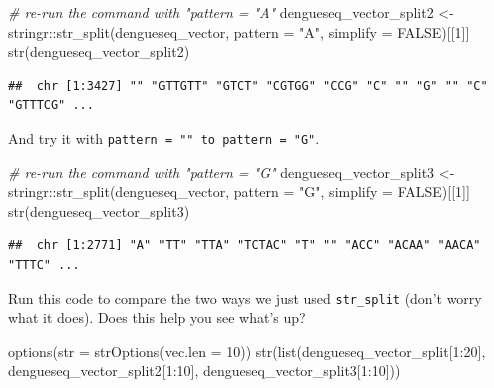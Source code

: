 \documentclass[
]{book}
\newenvironment{Shaded}{\begin{snugshade}}{\end{snugshade}}
\newcommand{\AttributeTok}[1]{\textcolor[rgb]{0.77,0.63,0.00}{#1}}
\newcommand{\CommentTok}[1]{\textcolor[rgb]{0.56,0.35,0.01}{\textit{#1}}}
\newcommand{\ConstantTok}[1]{\textcolor[rgb]{0.00,0.00,0.00}{#1}}
\newcommand{\DecValTok}[1]{\textcolor[rgb]{0.00,0.00,0.81}{#1}}
\newcommand{\FunctionTok}[1]{\textcolor[rgb]{0.00,0.00,0.00}{#1}}
\newcommand{\NormalTok}[1]{#1}
\newcommand{\OtherTok}[1]{\textcolor[rgb]{0.56,0.35,0.01}{#1}}
\newcommand{\SpecialCharTok}[1]{\textcolor[rgb]{0.00,0.00,0.00}{#1}}
\newcommand{\StringTok}[1]{\textcolor[rgb]{0.31,0.60,0.02}{#1}}
\begin{document}
\begin{Shaded}
\begin{Highlighting}[]
\CommentTok{\# re{-}run the command with "pattern  = "A"}
\NormalTok{dengueseq\_vector\_split2 }\OtherTok{\textless{}{-}}\NormalTok{ stringr}\SpecialCharTok{::}\FunctionTok{str\_split}\NormalTok{(dengueseq\_vector,}
                                       \AttributeTok{pattern =} \StringTok{"A"}\NormalTok{,}
                                       \AttributeTok{simplify =} \ConstantTok{FALSE}\NormalTok{)[[}\DecValTok{1}\NormalTok{]]}
\FunctionTok{str}\NormalTok{(dengueseq\_vector\_split2)}
\end{Highlighting}
\end{Shaded}

\begin{verbatim}
##  chr [1:3427] "" "GTTGTT" "GTCT" "CGTGG" "CCG" "C" "" "G" "" "C" "GTTTCG" ...
\end{verbatim}

And try it with \texttt{pattern\ =\ ""\ to\ pattern\ =\ "G"}.

\begin{Shaded}
\begin{Highlighting}[]
\CommentTok{\# re{-}run the command with "pattern  = "G"}
\NormalTok{dengueseq\_vector\_split3 }\OtherTok{\textless{}{-}}\NormalTok{ stringr}\SpecialCharTok{::}\FunctionTok{str\_split}\NormalTok{(dengueseq\_vector,}
                                       \AttributeTok{pattern =} \StringTok{"G"}\NormalTok{,}
                                       \AttributeTok{simplify =} \ConstantTok{FALSE}\NormalTok{)[[}\DecValTok{1}\NormalTok{]]}
\FunctionTok{str}\NormalTok{(dengueseq\_vector\_split3)}
\end{Highlighting}
\end{Shaded}

\begin{verbatim}
##  chr [1:2771] "A" "TT" "TTA" "TCTAC" "T" "" "ACC" "ACAA" "AACA" "TTTC" ...
\end{verbatim}

Run this code to compare the two ways we just used \texttt{str\_split} (don't worry what it does). Does this help you see what's up?

\begin{Shaded}
\begin{Highlighting}[]
\FunctionTok{options}\NormalTok{(}\AttributeTok{str =} \FunctionTok{strOptions}\NormalTok{(}\AttributeTok{vec.len =} \DecValTok{10}\NormalTok{))}
\FunctionTok{str}\NormalTok{(}\FunctionTok{list}\NormalTok{(dengueseq\_vector\_split[}\DecValTok{1}\SpecialCharTok{:}\DecValTok{20}\NormalTok{],}
\NormalTok{     dengueseq\_vector\_split2[}\DecValTok{1}\SpecialCharTok{:}\DecValTok{10}\NormalTok{], }
\NormalTok{     dengueseq\_vector\_split3[}\DecValTok{1}\SpecialCharTok{:}\DecValTok{10}\NormalTok{]))}
\end{Highlighting}
\end{Shaded}
\end{document}
